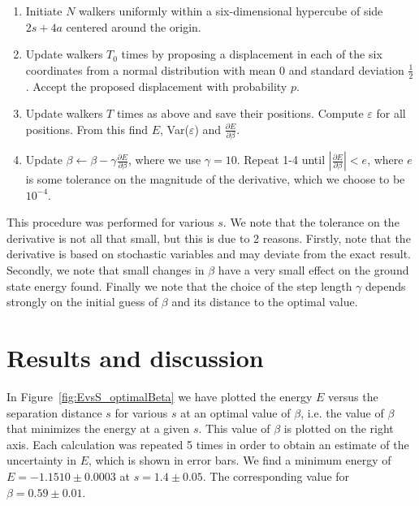 \documentclass[twoside]{article}
\begin{document}
\begin{enumerate}
	\item Initiate $N$ walkers uniformly within a six-dimensional hypercube of side $2s + 4a$ centered around the origin.
	\item Update walkers $T_0$ times by proposing a displacement in each of the six coordinates from a normal distribution with mean $0$ and standard deviation $\frac{1}{2}$. Accept the proposed displacement with probability $p$.
	\item Update walkers $T$ times as above and save their positions. Compute $\varepsilon$ for all positions. From this find $E$, Var($\varepsilon$) and $\frac{\partial E}{\partial \beta}$.
	\item Update $\beta \leftarrow \beta - \gamma \frac{\partial E}{\partial \beta}$, where we use $\gamma = 10$. Repeat 1-4 until $|\frac{\partial E}{\partial \beta}| < e$, where $e$ is some tolerance on the magnitude of the derivative, which we choose to be $10^{-4}$.
\end{enumerate}
This procedure was performed for various $s$. We note that the tolerance on the derivative is not all that small, but this is due to 2 reasons. Firstly, note that the derivative is based on stochastic variables and may deviate from the exact result. Secondly, we note that small changes in $\beta$ have a very small effect on the ground state energy found. Finally we note that the choice of the step length $\gamma$ depends strongly on the initial guess of $\beta$ and its distance to the optimal value. 


\section{Results and discussion}
In Figure~\ref{fig:EvsS_optimalBeta} we have plotted the energy $E$ versus the separation distance $s$ for various $s$ at an optimal value of $\beta$, i.e. the value of $\beta$ that minimizes the energy at a given $s$. This value of $\beta$ is plotted on the right axis. Each calculation was repeated 5 times in order to obtain an estimate of the uncertainty in $E$, which is shown in error bars. We find a minimum energy of $E = -1.1510 \pm 0.0003$ at $s = 1.4 \pm 0.05$. The corresponding value for $\beta = 0.59 \pm 0.01$. 
\end{document}
